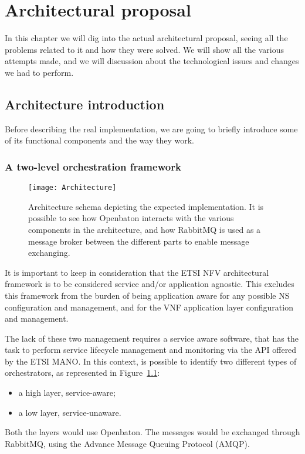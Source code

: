 \chapter{Architectural proposal}
\label{chap:archimpl}
 
In this chapter we will dig into the actual architectural proposal, seeing all
the problems related to it and how they were solved. We will show all the
various attempts made, and we will discussion about the technological issues and
changes we had to perform.

\section{Architecture introduction}
Before describing the real implementation, we are going to briefly introduce
some of its functional components and the way they work.

\subsection{A two-level orchestration framework}
\begin{figure}[t]
  \centering
  \texttt{[image: Architecture]}
  \caption[Architecture schema depicting the expected
    implementation]{Architecture schema depicting the expected implementation.
    It is possible to see how Openbaton interacts with the various components in
    the architecture, and how RabbitMQ is used as a message broker between the
    different parts to enable message exchanging.}
  \label{chap:archimpl:sec:fistattempt:img:architecture}
\end{figure}

It is important to keep in consideration that the ETSI NFV architectural
framework is to be considered service and/or application agnostic. This excludes
this framework from the burden of being application aware for any possible NS
configuration and management, and for the VNF application layer configuration
and management.

The lack of these two management requires a service aware software, that has the
task to perform service lifecycle management and monitoring via the API offered
by the ETSI MANO. In this context, is possible to identify two different types
of orchestrators, as represented in
Figure~\ref{chap:archimpl:sec:fistattempt:img:architecture}:
\begin{itemize}
\item a high layer, service-aware;
\item a low layer, service-unaware.
\end{itemize}
Both the layers would use Openbaton. The messages would be exchanged through
RabbitMQ, using the Advance Message Queuing Protocol (AMQP).

